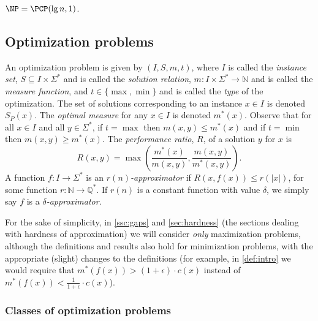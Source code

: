 \documentclass[]{article}
\begin{document}
\begin{theorem}\label{thm:pcp}
  $\NP = \PCP(\lg n, 1)$.
\end{theorem}

\subsection{Optimization problems}

An optimization problem is given by $(I, S, m, t)$, where $I$ is called the \emph{instance set}, $S \subseteq I \times \Sigma^*$ and is called the \emph{solution relation}, $m \colon I \times \Sigma^* \to \mathbb{N}$ and is called the \emph{measure function}, and $t\in\{\max, \min\}$ and is called the \emph{type} of the optimization.
The set of solutions corresponding to an instance $x \in I$ is denoted $S_P(x)$.
The \emph{optimal measure} for any $x \in I$ is denoted $m^*(x)$.
Observe that for all $x \in I$ and all $y \in \Sigma^*$, if $t = \max$ then $m(x, y) \leq m^*(x)$ and if $t = \min$ then $m(x, y) \geq m^*(x)$.
The \emph{performance ratio}, $R$, of a solution $y$ for $x$ is
\begin{displaymath}
  R(x, y) = \max{\left(\frac{m^*(x)}{m(x, y)}, \frac{m(x, y)}{m^*(x, y)}\right)}.
\end{displaymath}
A function $f \colon I \to \Sigma^*$ is an \emph{$r(n)$-approximator} if $R(x, f(x)) \leq r(|x|)$, for some function $r \colon \mathbb{N} \to \mathbb{Q}^*$.
If $r(n)$ is a constant function with value $\delta$, we simply say $f$ is a \emph{$\delta$-approximator}.

For the sake of simplicity, in \autoref{ssc:gaps} and \autoref{sec:hardness} (the sections dealing with hardness of approximation) we will consider \emph{only} maximization problems, although the definitions and results also hold for minimization problems, with the appropriate (slight) changes to the definitions (for example, in \autoref{def:intro} we would require that $m^*(f(x)) > (1 + \epsilon) \cdot c(x)$ instead of $m^*(f(x)) < \frac{1}{1 + \epsilon} \cdot c(x)$).

\subsubsection{Classes of optimization problems}
\end{document}
